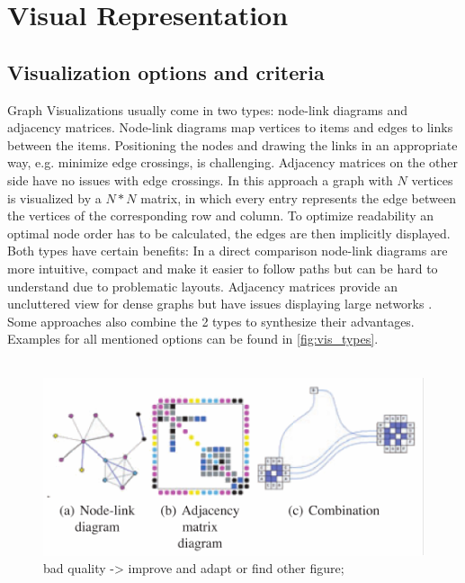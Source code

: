 \section{Visual Representation}
\subsection{Visualization options and criteria}
Graph Visualizations usually come in two types: node-link diagrams and adjacency matrices.
Node-link diagrams map vertices to items and edges to links between the items. Positioning the nodes and drawing the links in an appropriate way, e.g. minimize edge crossings, is challenging. Adjacency matrices on the other side have no issues with edge crossings. In this approach a graph with $N$ vertices is visualized by a $N * N $ matrix, in which every entry represents the edge between the vertices of the corresponding row and column. To optimize readability an optimal node order has to be calculated, the edges are then implicitly displayed.
Both types have certain benefits: In a direct comparison node-link diagrams are more intuitive, compact and make it easier to follow paths but can be hard to understand due to problematic layouts. Adjacency matrices provide an uncluttered view for dense graphs but have issues displaying large networks \cite{Ghoniem2004}. Some approaches also combine the 2 types to synthesize their advantages. Examples for all mentioned options can be found in \autoref{fig:vis_types}.
\\
\\
\begin{figure}
    \centering
    \includegraphics[width=\linewidth]{media/vis_types.pdf}
    \caption{bad quality -> improve and adapt or find other figure; \cite{VonLandesberger2011}}
    \label{fig:vis_types}
\end{figure}


